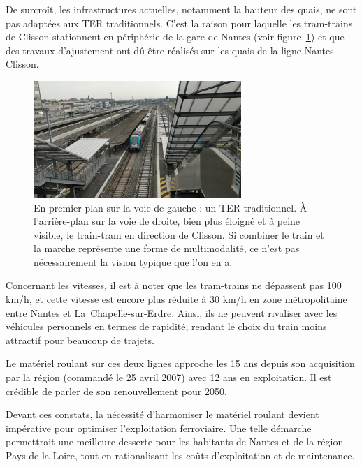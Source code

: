 De surcroît, les infrastructures actuelles, notamment la hauteur des
quais, ne sont pas adaptées aux TER traditionnels. C'est la raison
pour laquelle les tram-trains de Clisson stationnent en périphérie de
la gare de Nantes (voir figure~\ref{fig:clisson}) et que des travaux
d'ajustement ont dû être réalisés sur les quais de la ligne
Nantes-Clisson.

\begin{figure}[ht]
  \centering
  \includegraphics[width=0.7\textwidth]{images/IMG_20230908_104847-clisson.jpg}
  \caption{En premier plan sur la voie de gauche : un TER
    traditionnel.  À l'arrière-plan sur la voie de droite, bien plus
    éloigné et à peine visible, le train-tram en direction de Clisson.
    Si combiner le train et la marche représente une forme de
    multimodalité, ce n'est pas nécessairement la vision typique que
    l'on en a.}
  \label{fig:clisson}
\end{figure}

Concernant les vitesses, il est à noter que les tram-trains ne
dépassent pas 100 km/h, et cette vitesse est encore plus réduite à 30
km/h en zone métropolitaine entre Nantes et
La~Chapelle-sur-Erdre. Ainsi, ils ne peuvent rivaliser avec les
véhicules personnels en termes de rapidité, rendant le choix du train
moins attractif pour beaucoup de trajets.

Le matériel roulant sur ces deux lignes approche les 15 ans depuis son
acquisition par la région (commandé le 25 avril 2007) avec 12 ans en
exploitation. Il est crédible de parler de son renouvellement pour
2050.

Devant ces constats, la nécessité d'harmoniser le matériel roulant
devient impérative pour optimiser l'exploitation ferroviaire. Une
telle démarche permettrait une meilleure desserte pour les habitants
de Nantes et de la région Pays de la Loire, tout en rationalisant les
coûts d'exploitation et de maintenance.


